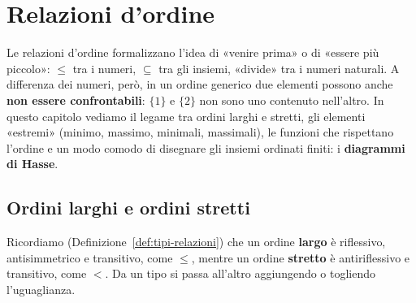 \chapter{Relazioni d'ordine}\label{cap:ordini}

Le relazioni d'ordine formalizzano l'idea di «venire prima» o di «essere più piccolo»: $\leq$ tra i numeri, $\subseteq$ tra
gli insiemi, «divide» tra i numeri naturali. A differenza dei numeri, però, in un ordine generico due elementi possono anche
\textbf{non essere confrontabili}: $\{1\}$ e $\{2\}$ non sono uno contenuto nell'altro. In questo capitolo vediamo il legame tra
ordini larghi e stretti, gli elementi «estremi» (minimo, massimo, minimali, massimali), le funzioni che rispettano l'ordine e
un modo comodo di disegnare gli insiemi ordinati finiti: i \textbf{diagrammi di Hasse}.

\section{Ordini larghi e ordini stretti}\label{sec:largo-stretto}

Ricordiamo (Definizione~\ref{def:tipi-relazioni}) che un ordine \textbf{largo} è riflessivo, antisimmetrico e transitivo, come
$\leq$, mentre un ordine \textbf{stretto} è antiriflessivo e transitivo, come $<$. Da un tipo si passa all'altro aggiungendo o
togliendo l'uguaglianza.


